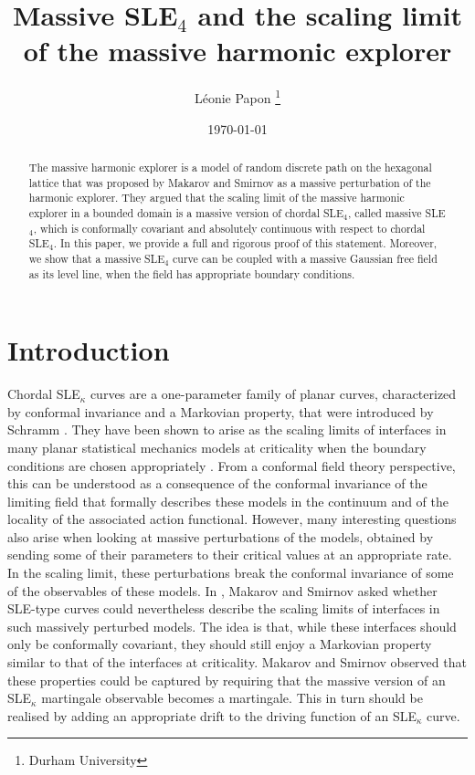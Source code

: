 \documentclass{article}
\title{Massive SLE$_4$ and the scaling limit of the massive harmonic explorer}
\author{L\'eonie Papon \thanks{Durham University}}
\date{\today}
\theoremstyle{definition}
\theoremstyle{remark}
\theoremstyle{remark}
\begin{document}
\maketitle

\begin{abstract}
The massive harmonic explorer is a model of random discrete path on the hexagonal lattice that was proposed by Makarov and Smirnov as a massive perturbation of the harmonic explorer. They argued that the scaling limit of the massive harmonic explorer in a bounded domain is a massive version of chordal SLE$_4$, called massive SLE$_4$, which is conformally covariant and absolutely continuous with respect to chordal SLE$_4$. In this paper, we provide a full and rigorous proof of this statement. Moreover, we show that a massive SLE$_4$ curve can be coupled with a massive Gaussian free field as its level line, when the field has appropriate boundary conditions.
\end{abstract}

\section{Introduction}

Chordal SLE$_\kappa$ curves are a one-parameter family of planar curves, characterized by conformal invariance and a Markovian property, that were introduced by Schramm \cite{Schramm_SLE}. They have been shown to arise as the scaling limits of interfaces in many planar statistical mechanics models at criticality when the boundary conditions are chosen appropriately \cite{percolation, LERW, HE, DGFF, Ising}. From a conformal field theory perspective, this can be understood as a consequence of the conformal invariance of the limiting field that formally describes these models in the continuum and of the locality of the associated action functional. However, many interesting questions also arise when looking at massive perturbations of the models, obtained by sending some of their parameters to their critical values at an appropriate rate. In the scaling limit, these perturbations break the conformal invariance of some of the observables of these models. In \cite{off_SLE}, Makarov and Smirnov asked whether SLE-type curves could nevertheless describe the scaling limits of interfaces in such massively perturbed models. The idea is that, while these interfaces should only be conformally covariant, they should still enjoy a Markovian property similar to that of the interfaces at criticality. Makarov and Smirnov observed that these properties could be captured by requiring that the massive version of an SLE$_\kappa$ martingale observable becomes a martingale. This in turn should be realised by adding an appropriate drift to the driving function of an SLE$_\kappa$ curve. 
\end{document}
